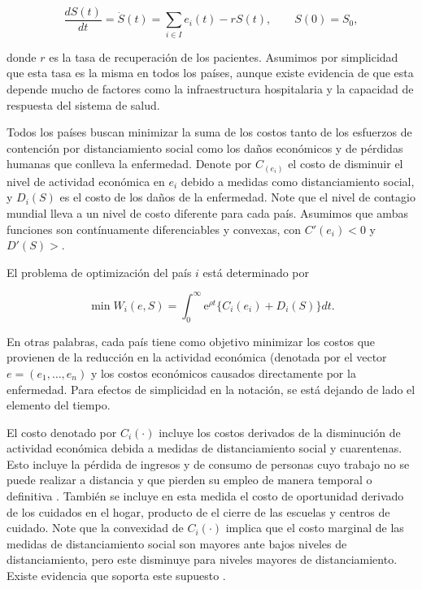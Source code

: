 \documentclass[11pt, oneside]{article}
\begin{document}
\begin{equation}
	\frac{d S(t)}{dt} = \dot{S}(t) = \sum_{i \in I} e_i(t) - r S(t), \qquad S(0) = S_0,
\end{equation}

donde $r$ es la tasa de recuperación de los pacientes. Asumimos por simplicidad que esta tasa es la misma en todos los países, aunque existe evidencia de que esta depende mucho de factores como la infraestructura hospitalaria y la capacidad de respuesta del sistema de salud. 

Todos los países buscan minimizar la suma de los costos tanto de los esfuerzos de contención por distanciamiento social como los daños económicos y de pérdidas humanas que conlleva la enfermedad. Denote por $C_(e_i)$ el costo de disminuir el nivel de actividad económica en $e_i$ debido a medidas como distanciamiento social, y $D_i(S)$ es el costo de los daños de la enfermedad. Note que el nivel de contagio mundial lleva a un nivel de costo diferente para cada país. Asumimos que ambas funciones son contínuamente diferenciables y convexas, con $C'(e_i) < 0$ y $D'(S) >$.

El problema de optimización del país $i$ está determinado por

\begin{equation}
	\min W_i(e,S) = \int_0^\infty \ensuremath{\mathrm{e}}^{\rho t}\{C_i(e_i) + D_i(S)\} dt.
\end{equation}

En otras palabras, cada país tiene como objetivo minimizar los costos que provienen de la reducción en la actividad económica (denotada por el vector $e = (e_1,\dots,e_n)$ y los costos económicos causados directamente por la enfermedad. Para efectos de simplicidad en la notación, se está dejando de lado el elemento del tiempo.

El costo denotado por $C_i(\cdot)$ incluye los costos derivados de la disminución de actividad económica debida a medidas de distanciamiento social y cuarentenas. Esto incluye la pérdida de ingresos y de consumo de personas cuyo trabajo no se puede realizar a distancia y que pierden su empleo de manera temporal o definitiva \cite{sdffsadaf}. También se incluye en esta medida el costo de oportunidad derivado de los cuidados en el hogar, producto de el cierre de las escuelas y centros de cuidado. Note que la convexidad de $C_i(\cdot)$ implica que el costo marginal de las medidas de distanciamiento social son mayores ante bajos niveles de distanciamiento, pero este disminuye para niveles mayores de distanciamiento. Existe evidencia que soporta este supuesto \cite{evidencia}.
\end{document}
